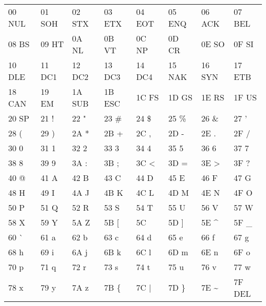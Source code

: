 
{\tt
\begin{tabular}{|l|l|l|l|l|l|l|l|}
\hline
00 NUL & 01 SOH & 02 STX & 03 ETX & 04 EOT & 05 ENQ & 06 ACK & 07 BEL \\
08 BS  & 09 HT  & 0A NL  & 0B VT  & 0C NP  & 0D CR  & 0E SO  & 0F SI  \\
10 DLE & 11 DC1 & 12 DC2 & 13 DC3 & 14 DC4 & 15 NAK & 16 SYN & 17 ETB \\
18 CAN & 19 EM  & 1A SUB & 1B ESC & 1C FS  & 1D GS  & 1E RS  & 1F US  \\
20 SP  & 21  !  & 22  "  & 23  \# & 24 \$ & 25  \% & 26  \& & 27  '  \\
28  (  & 29  )  & 2A  *  & 2B  +  & 2C  ,  & 2D  -  & 2E  .  & 2F  /  \\
30  0  & 31  1  & 32  2  & 33  3  & 34  4  & 35  5  & 36  6  & 37  7  \\
38  8  & 39  9  & 3A  :  & 3B  ;  & 3C  <  & 3D  =  & 3E  >  & 3F  ?  \\
40  @  & 41  A  & 42  B  & 43  C  & 44  D  & 45  E  & 46  F  & 47  G  \\
48  H  & 49  I  & 4A  J  & 4B  K  & 4C  L  & 4D  M  & 4E  N  & 4F  O  \\
50  P  & 51  Q  & 52  R  & 53  S  & 54  T  & 55  U  & 56  V  & 57  W  \\
58  X  & 59  Y  & 5A  Z  & 5B  [  & 5C  \  & 5D  ]  & 5E  \^ & 5F  \_  \\
60  \` & 61  a  & 62  b  & 63  c  & 64  d  & 65  e  & 66  f  & 67  g  \\
68  h  & 69  i  & 6A  j  & 6B  k  & 6C  l  & 6D  m  & 6E  n  & 6F  o  \\
70  p  & 71  q  & 72  r  & 73  s  & 74  t  & 75  u  & 76  v  & 77  w  \\
78  x  & 79  y  & 7A  z  & 7B  \{ & 7C  |  & 7D  \} & 7E  \~ & 7F DEL \\
\hline
\end{tabular}
}

